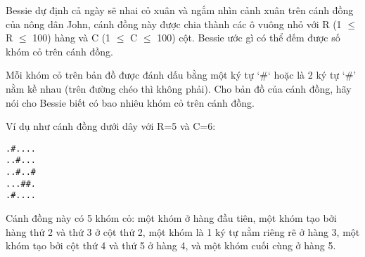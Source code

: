 Bessie dự định cả ngày sẽ nhai cỏ xuân và ngắm nhìn cảnh xuân trên  cánh đồng của nông dân John, cánh đồng này được chia thành các ô vuông nhỏ với R (1  $\le$  R  $\le$  100) hàng và C (1  $\le$  C  $\le$  100) cột. Bessie ước gì  có thể đếm được số khóm cỏ trên cánh đồng.  

   Mỗi khóm cỏ trên bản đồ được đánh dấu bằng một ký tự ‘\#‘ hoặc là 2 ký  tự ‘\#’ nằm kề nhau (trên đường chéo thì không phải). Cho bản đồ của  cánh đồng, hãy nói cho Bessie biết có bao nhiêu khóm cỏ trên  cánh đồng.  

   Ví dụ như cánh đồng dưới dây với R=5 và C=6:  
\begin{verbatim}
.#....
..#...
..#..#
...##.
.#....
\end{verbatim}

   Cánh đồng này có 5 khóm cỏ: một khóm ở hàng đầu tiên, một khóm tạo  bởi hàng thứ 2 và thứ 3 ở cột thứ 2, một khóm là 1 ký tự nằm riêng  rẽ ở hàng 3, một khóm tạo bởi cột thứ 4 và thứ 5 ở hàng 4, và một  khóm cuối cùng ở hàng 5.  

\